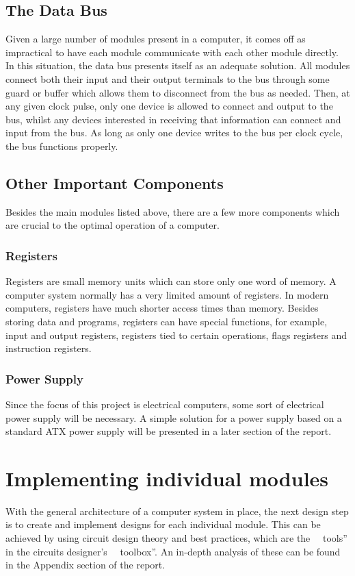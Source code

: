 \subsection{The Data Bus}
Given a large number of modules present in a computer, it comes off as impractical to have each module communicate with each other module directly. In this situation, the data bus presents itself as an adequate solution. All modules connect both their input and their output terminals to the bus through some guard or buffer which allows them to disconnect from the bus as needed. Then, at any given clock pulse, only one device is allowed to connect and output to the bus, whilst any devices interested in receiving that information can connect and input from the bus. As long as only one device writes to the bus per clock cycle, the bus functions properly.

\subsection{Other Important Components}
Besides the main modules listed above, there are a few more components which are crucial to the optimal operation of a computer.

\subsubsection{Registers}
Registers are small memory units which can store only one word of memory. A computer system normally has a very limited amount of registers. In modern computers, registers have much shorter access times than memory. Besides storing data and programs, registers can have special functions, for example, input and output registers, registers tied to certain operations, flags registers and instruction registers.

\subsubsection{Power Supply}
Since the focus of this project is electrical computers, some sort of electrical power supply will be necessary. A simple solution for a power supply based on a standard ATX power supply will be presented in a later section of the report.

\section{Implementing individual modules}
With the general architecture of a computer system in place, the next design step is to create and implement designs for each individual module. This can be achieved by using circuit design theory and best practices, which are the ~~tools'' in the circuits designer's ~~toolbox''. An in-depth analysis of these can be found in the Appendix section of the report.



